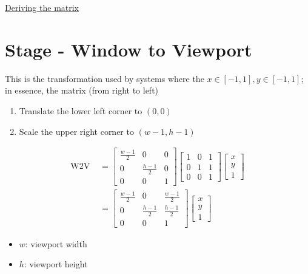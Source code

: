       \href{http://www.songho.ca/opengl/gl_projectionmatrix.html}{Deriving
      the matrix}

\section{Stage - Window to Viewport}

  This is the transformation used by systems where the
  $ x \in \left[ -1, 1 \right], y \in \left[ -1, 1 \right] $; in essence,
  the matrix (from right to left)

  \begin{enumerate}
    \item Translate the lower left corner to $ \left( 0, 0 \right) $
    \item Scale the upper right corner to $ \left( w - 1, h - 1 \right) $
  \end{enumerate}

  \begin{align}
    \text{W2V } &=
    \begin{bmatrix}
      \frac{w - 1}{2} & 0 & 0 \\
      0 & \frac{h - 1}{2} & 0 \\
      0 & 0 & 1
    \end{bmatrix}
    \begin{bmatrix}
      1 & 0 & 1 \\
      0 & 1 & 1 \\
      0 & 0 & 1
    \end{bmatrix}
    \begin{bmatrix}
      x \\
      y \\
      1
    \end{bmatrix} \\
    &=
    \begin{bmatrix}
      \frac{w - 1}{2} & 0 & \frac{w - 1}{2} \\
      0 & \frac{h - 1}{2} & \frac{h - 1}{2} \\
      0 & 0 & 1
    \end{bmatrix}
    \begin{bmatrix}
      x \\
      y \\
      1
    \end{bmatrix}
  \end{align}

  \begin{itemize}
    \item $ w $: viewport width
    \item $ h $: viewport height
  \end{itemize}

